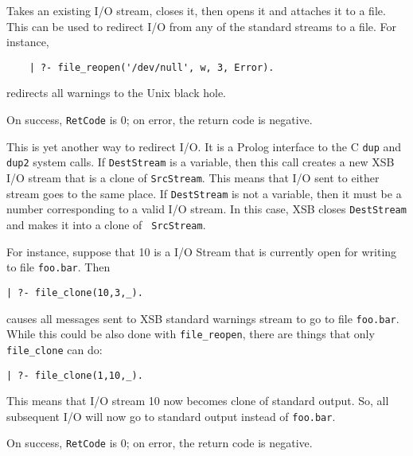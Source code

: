\begin{description}

    Takes an existing I/O stream, closes it, then opens it and
    attaches it to a file. This can be used to redirect I/O from any of the
    standard streams to a file. For instance, 
\begin{verbatim}
    | ?- file_reopen('/dev/null', w, 3, Error).
\end{verbatim}
    redirects all warnings to the Unix black hole. 

    On success, {\tt RetCode} is 0; on error, the return code is negative.


This is yet another way to redirect I/O. It is a Prolog interface to
the C {\tt dup} and {\tt dup2} system calls. If {\tt DestStream} is a
variable, then this call creates a new XSB I/O stream that is a clone
of {\tt SrcStream}. This means that I/O sent to either stream goes
to the same place. If {\tt DestStream} is not a variable, then it must
be a number corresponding to a valid I/O stream. In this case, XSB
closes {\tt DestStream} and makes it into a clone of {\tt
SrcStream}. 

For instance, suppose that 10 is a I/O Stream that is currently open
for writing to file {\tt foo.bar}.  Then 
\begin{verbatim} 
| ?- file_clone(10,3,_).  
\end{verbatim} 
causes all messages sent to XSB standard warnings stream to go to file
{\tt foo.bar}. While this could be also done with {\tt file\_reopen},
there are things that only {\tt file\_clone} can do: 
\begin{verbatim} 
| ?- file_clone(1,10,_). 
\end{verbatim} 
This means that I/O stream 10 now becomes clone of standard
output. So, all subsequent I/O will now go to standard output instead
of {\tt foo.bar}.

On success, {\tt RetCode} is 0; on error, the return code is negative.


\end{description}
